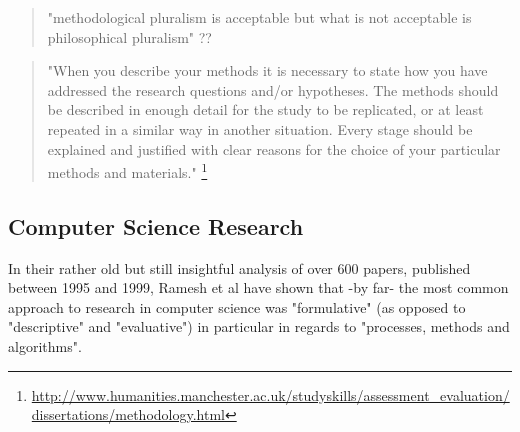 \begin{quote}
  "methodological pluralism is acceptable but what is not acceptable is philosophical pluralism" ??
\end{quote}

\begin{comment}
  What would be traditional RM in those fields?\\
  Why can I not mix and match them?\\
  What do I do now/instead?\\
  Can inter/multi/trans-disciplinary research be NOT collaborative but done by a single person?
\end{comment}

\begin{quote}
  "When you describe your methods it is necessary to state how you have addressed the research questions and/or hypotheses. The methods should be described in enough detail for the study to be replicated, or at least repeated in a similar way in another situation. Every stage should be explained and justified with clear reasons for the choice of your particular methods and materials." \footnote{\url{http://www.humanities.manchester.ac.uk/studyskills/assessment_evaluation/dissertations/methodology.html}}
\end{quote}

\subsection{Computer Science Research}

In their rather old but still insightful analysis of over 600 papers, published between 1995 and 1999, Ramesh et al \citep{Ramesh2004} have shown that -by far- the most common approach to research in computer science was "formulative" (as opposed to "descriptive" and "evaluative") in particular in regards to "processes, methods and algorithms".

